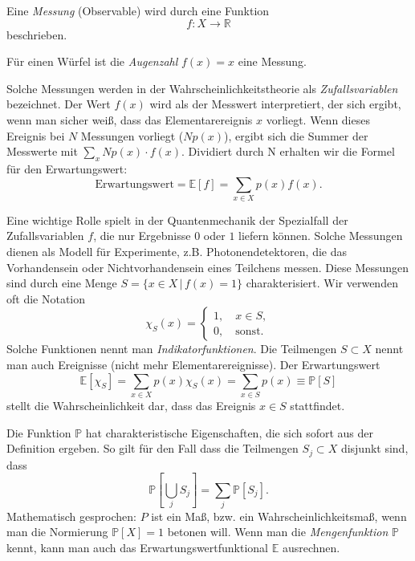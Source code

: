 Eine \emph{Messung} (Observable) wird durch eine Funktion 
\begin{equation}
	f:X\rightarrow \mathbb{R}
\end{equation}
beschrieben. 
\begin{beispiel}
	Für einen Würfel ist die \emph{Augenzahl} $f(x) = x$ eine Messung.
\end{beispiel}
Solche Messungen werden in der Wahrscheinlichkeitstheorie als \emph{Zufallsvariablen} bezeichnet. Der Wert $f(x)$ wird als der Messwert interpretiert, der sich ergibt, wenn man sicher weiß, dass das Elementarereignis $x$ vorliegt. Wenn dieses Ereignis bei $N$ Messungen vorliegt ($Np(x)$), ergibt sich die Summer der Messwerte mit $\sum_x N p(x) \cdot f(x)$. Dividiert durch N erhalten wir die Formel für den Erwartungswert:
\begin{equation}
	\text{Erwartungswert} = \mathbb{E}[f] = \sum_{x\in X} p(x)f(x).
\end{equation}

Eine wichtige Rolle spielt in der Quantenmechanik der Spezialfall der Zufallsvariablen $f$, die nur Ergebnisse $0$ oder $1$ liefern können. Solche Messungen dienen als Modell für Experimente, z.B. Photonendetektoren, die das Vorhandensein oder Nichtvorhandensein eines Teilchens messen. Diese Messungen sind durch eine Menge $S=\{x\in X\,|\, f(x) =1\}$ charakterisiert. Wir verwenden oft die Notation 
\begin{equation}
	\chi_S(x) = \begin{cases}
		1, \quad x\in S, \\
		0, \quad \text{sonst.}
	\end{cases}
\end{equation}
Solche Funktionen nennt man \emph{Indikatorfunktionen}. Die Teilmengen $S\subset X$
nennt man auch Ereignisse (nicht mehr Elementarereignisse). Der Erwartungswert 
\begin{equation}\label{eq:indicatorfunction}
	\mathbb{E}[\chi_S] = \sum_{x\in X} p(x)\chi_S(x) = \sum_{x\in S} p(x) \equiv \mathbb{P}[S]
\end{equation}
stellt die Wahrscheinlichkeit dar, dass das Ereignis $x\in S$ stattfindet.

Die Funktion $\mathbb{P}$ hat charakteristische Eigenschaften, die sich sofort aus der Definition ergeben. So gilt für den Fall dass die Teilmengen $S_j\subset X$ disjunkt sind, dass 
\begin{equation}
	\mathbb{P}\left[\bigcup_j S_j \right] = \sum_{j} \mathbb{P}[S_j].
\end{equation}
Mathematisch gesprochen: $P$ ist ein Maß, bzw. ein Wahrscheinlichkeitsmaß, wenn man die Normierung $\mathbb{P}[X] = 1$ betonen will. Wenn man die \emph{Mengenfunktion} $\mathbb{P}$ kennt, kann man auch das Erwartungswertfunktional $\mathbb{E}$ ausrechnen. 

